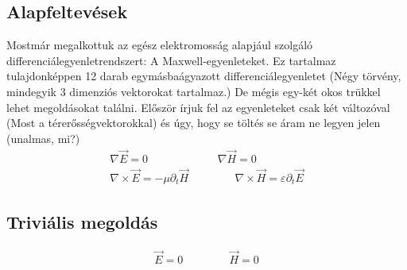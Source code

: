\documentclass{article}
\begin{document}
\subsection{Alapfeltevések}
Mostmár megalkottuk az egész elektromosság alapjául szolgáló differenciálegyenletrendszert: A Maxwell-egyenleteket. Ez tartalmaz tulajdonképpen 12 darab egymásbaágyazott differenciálegyenletet (Négy törvény, mindegyik 3 dimenziós vektorokat tartalmaz.) De mégis egy-két okos trükkel lehet megoldásokat találni. Először írjuk fel az egyenleteket csak két változóval (Most a térerősségvektorokkal) és úgy, hogy se töltés se áram ne legyen jelen (unalmas, mi?)
\begin{gather*}
\nabla \vec{E}= 0 \hspace{70pt} \ \ \nabla \vec{H} = 0 \\
\nabla \times \vec{E} = -\mu \partial_t \vec{H} \hspace{50pt} \nabla \times \vec{H} = \varepsilon \partial_t \vec{E}
\end{gather*} 
\subsection{Triviális megoldás}
\begin{align*}
\vec{E} = 0 \hspace{50pt} \vec{H} = 0
\end{align*}
\end{document}
